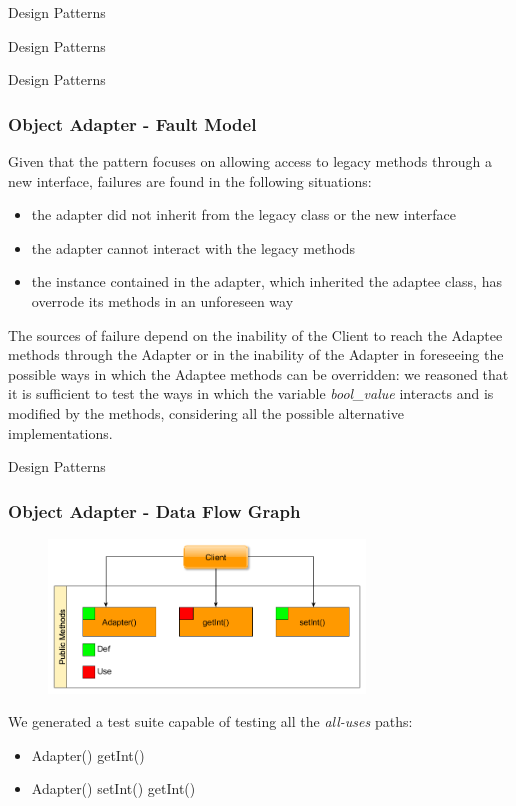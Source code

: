 \documentclass{beamer}
\begin{document}
\begin{section}{Design Patterns}
\begin{subsection}{Design Patterns}
\begin{frame}
		\end{frame}
	\end{subsection}

\begin{subsection}{Design Patterns}
\begin{frame}
	\frametitle{Object Adapter - Fault Model}
	
	Given that the pattern focuses on allowing access to legacy methods through a new interface, failures are found in the following situations:  
	\begin{itemize}
		\item the adapter did not inherit from the legacy class or the new interface
		\item the adapter cannot interact with the legacy methods 
		\item the instance contained in the adapter, which inherited the adaptee class, has overrode its methods in an unforeseen way
	\end{itemize}
\vspace{5mm}
	The sources of failure depend on the inability of the Client to reach the Adaptee methods through the Adapter or in the inability of the Adapter in foreseeing the possible ways in which the Adaptee methods can be overridden:  we reasoned that it is sufficient to test the ways in which the variable \textit{bool\_value} interacts and is modified by the methods, considering all the possible alternative implementations. 

\end{frame}
	\end{subsection}


\begin{subsection}{Design Patterns}
	\begin{frame}
		\frametitle{Object Adapter - Data Flow Graph}
		\begin{figure}[h]
			\centering
			\includegraphics[width=0.75\textwidth]{./Adapter/Object/CallGraph.png}	
			\label{CAdataflow}
		\end{figure}
		We generated a test suite capable of testing all the \textit{all-uses} paths:
		\begin{itemize}
			\item Adapter() getInt() 
			\item Adapter() setInt() getInt() 
			

\end{itemize}
\end{frame}
\end{subsection}
\end{section}
\end{document}
